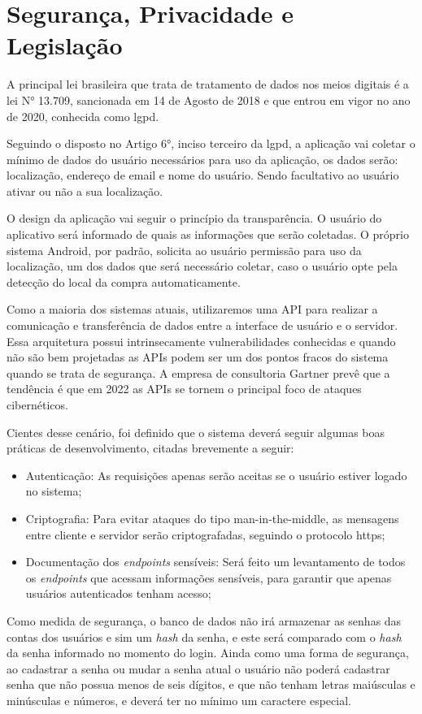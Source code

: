\section{Segurança, Privacidade e Legislação}

A principal lei brasileira que trata de tratamento de dados  nos meios digitais é a lei N° 13.709, sancionada em 14 de Agosto de 2018 \cite{leigpd} e que entrou em vigor no ano de 2020, conhecida como \gls{lgpd}.

Seguindo o disposto no Artigo 6°, inciso terceiro da \gls{lgpd}, a aplicação vai coletar o mínimo de dados do usuário necessários para uso da aplicação, os dados serão: localização, endereço de email e nome do usuário. Sendo facultativo ao usuário ativar ou não a sua localização.

O design da aplicação vai seguir o princípio da transparência. O usuário do aplicativo será informado de quais as informações que serão coletadas. O próprio sistema Android, por padrão, solicita ao usuário permissão para uso da localização, um dos dados que será necessário coletar, caso o usuário opte pela detecção do local da compra automaticamente.

Como a maioria dos sistemas atuais, utilizaremos uma \gls{API} para realizar a comunicação e transferência de dados entre a interface de usuário e o servidor. Essa arquitetura possui intrinsecamente vulnerabilidades conhecidas e quando não são bem projetadas as \glspl{API} podem ser um dos pontos fracos do sistema quando se trata de segurança. A empresa de consultoria Gartner \cite{anilLamba} prevê que a tendência é que em 2022 as \glspl{API} se tornem o principal foco de ataques cibernéticos.

Cientes desse cenário, foi definido que o sistema deverá seguir algumas boas práticas de desenvolvimento, citadas brevemente a seguir:
\begin{itemize}
	\item Autenticação: As requisições apenas serão aceitas se o usuário estiver logado no sistema;
	\item Criptografia: Para evitar ataques do tipo man-in-the-middle, as mensagens entre cliente e servidor serão criptografadas, seguindo o protocolo \gls{https};
	\item Documentação dos \textit{endpoints} sensíveis: Será feito um levantamento de todos os \textit{endpoints} que acessam informações sensíveis, para garantir que apenas usuários autenticados tenham acesso;
\end{itemize}

Como medida de segurança, o banco de dados não irá armazenar as senhas das contas dos usuários e sim um \textit{hash} da senha, e este será comparado com o \textit{hash} da senha informado no momento do login. Ainda como uma forma de segurança, ao cadastrar a senha ou mudar a senha atual o usuário não poderá cadastrar senha que não possua menos de seis dígitos, e que não tenham letras maiúsculas e minúsculas e números, e deverá ter no mínimo um caractere especial.